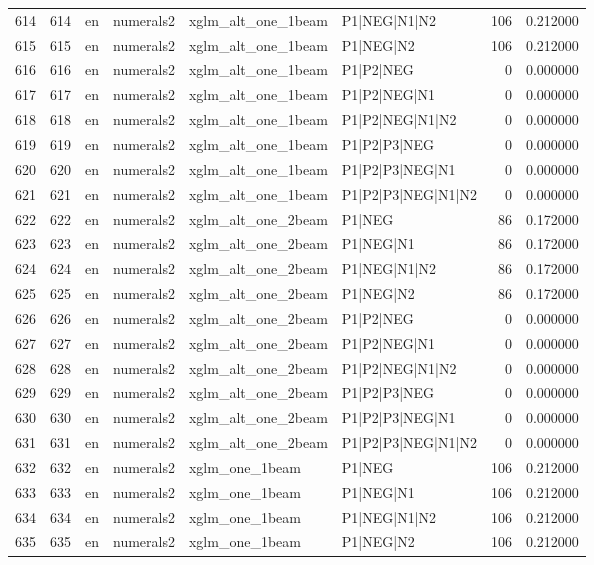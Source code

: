 \begin{tabular}{lrllllrr}
614 & 614 & en & numerals2 & xglm_alt_one_1beam & P1|NEG|N1|N2 & 106 & 0.212000 \\
615 & 615 & en & numerals2 & xglm_alt_one_1beam & P1|NEG|N2 & 106 & 0.212000 \\
616 & 616 & en & numerals2 & xglm_alt_one_1beam & P1|P2|NEG & 0 & 0.000000 \\
617 & 617 & en & numerals2 & xglm_alt_one_1beam & P1|P2|NEG|N1 & 0 & 0.000000 \\
618 & 618 & en & numerals2 & xglm_alt_one_1beam & P1|P2|NEG|N1|N2 & 0 & 0.000000 \\
619 & 619 & en & numerals2 & xglm_alt_one_1beam & P1|P2|P3|NEG & 0 & 0.000000 \\
620 & 620 & en & numerals2 & xglm_alt_one_1beam & P1|P2|P3|NEG|N1 & 0 & 0.000000 \\
621 & 621 & en & numerals2 & xglm_alt_one_1beam & P1|P2|P3|NEG|N1|N2 & 0 & 0.000000 \\
622 & 622 & en & numerals2 & xglm_alt_one_2beam & P1|NEG & 86 & 0.172000 \\
623 & 623 & en & numerals2 & xglm_alt_one_2beam & P1|NEG|N1 & 86 & 0.172000 \\
624 & 624 & en & numerals2 & xglm_alt_one_2beam & P1|NEG|N1|N2 & 86 & 0.172000 \\
625 & 625 & en & numerals2 & xglm_alt_one_2beam & P1|NEG|N2 & 86 & 0.172000 \\
626 & 626 & en & numerals2 & xglm_alt_one_2beam & P1|P2|NEG & 0 & 0.000000 \\
627 & 627 & en & numerals2 & xglm_alt_one_2beam & P1|P2|NEG|N1 & 0 & 0.000000 \\
628 & 628 & en & numerals2 & xglm_alt_one_2beam & P1|P2|NEG|N1|N2 & 0 & 0.000000 \\
629 & 629 & en & numerals2 & xglm_alt_one_2beam & P1|P2|P3|NEG & 0 & 0.000000 \\
630 & 630 & en & numerals2 & xglm_alt_one_2beam & P1|P2|P3|NEG|N1 & 0 & 0.000000 \\
631 & 631 & en & numerals2 & xglm_alt_one_2beam & P1|P2|P3|NEG|N1|N2 & 0 & 0.000000 \\
632 & 632 & en & numerals2 & xglm_one_1beam & P1|NEG & 106 & 0.212000 \\
633 & 633 & en & numerals2 & xglm_one_1beam & P1|NEG|N1 & 106 & 0.212000 \\
634 & 634 & en & numerals2 & xglm_one_1beam & P1|NEG|N1|N2 & 106 & 0.212000 \\
635 & 635 & en & numerals2 & xglm_one_1beam & P1|NEG|N2 & 106 & 0.212000 \\

\end{tabular}
